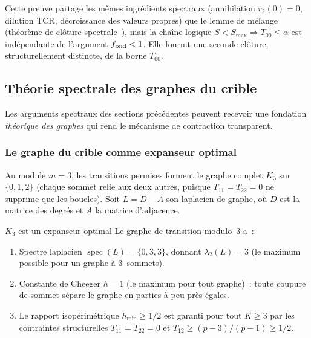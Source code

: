 \documentclass[12pt,a4paper]{article}
\begin{document}
\begin{remarque}
Cette preuve partage les mêmes ingrédients spectraux (annihilation
$r_2(0) = 0$, dilution TCR, décroissance des valeurs propres) que le
lemme de mélange (théorème de clôture
spectrale~\cite{companion_M3}), mais la chaîne logique
$S < S_{\max} \Rightarrow T_{00} \leq \alpha$ est indépendante de
l'argument $f_{\rm bnd} < 1$. Elle fournit une seconde clôture,
structurellement distincte, de la borne $T_{00}$.
\end{remarque}

\subsection{Théorie spectrale des graphes du crible}
\label{sec:ch7b_spectral_graph}

Les arguments spectraux des sections précédentes peuvent recevoir une
fondation \emph{théorique des graphes} qui rend le mécanisme de
contraction transparent.

\subsubsection{Le graphe du crible comme expanseur optimal}

Au module $m = 3$, les transitions permises forment le graphe complet
$K_3$ sur $\{0,1,2\}$ (chaque sommet relie aux deux autres, puisque
$T_{11} = T_{22} = 0$ ne supprime que les boucles).
Soit $L = D - A$ son laplacien de graphe, où $D$ est la matrice des
degrés et $A$ la matrice d'adjacence.

\begin{thmbox}{$K_3$ est un expanseur optimal}
\label{thm:expander_ext}
Le graphe de transition modulo~3 a~:
\begin{enumerate}[nosep]
\item Spectre laplacien $\operatorname{spec}(L) = \{0, 3, 3\}$,
  donnant $\lambda_2(L) = 3$ (le maximum possible pour un graphe à
  3~sommets).
\item Constante de Cheeger $h = 1$ (le maximum pour tout graphe)~:
  toute coupure de sommet sépare le graphe en parties à peu près
  égales.
\item Le rapport isopérimétrique $h_{\min} \geq 1/2$ est garanti pour
  tout $K \geq 3$ par les contraintes structurelles
  $T_{11} = T_{22} = 0$ et
  $T_{12} \geq (p-3)/(p-1) \geq 1/2$.
\end{enumerate}
\end{thmbox}
\end{document}
